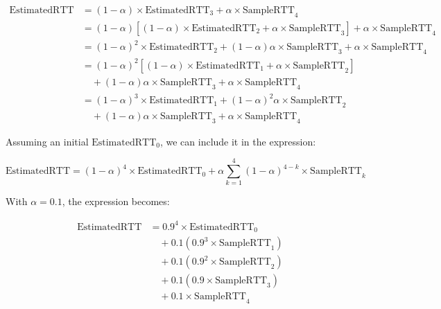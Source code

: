 \documentclass{cshwk}
\begin{document}
\[
    \begin{aligned}
        \text{EstimatedRTT} & = (1 - \alpha) \times \text{EstimatedRTT}_3 + \alpha \times \text{SampleRTT}_4                                                                \\
                            & = (1 - \alpha) \left[ (1 - \alpha) \times \text{EstimatedRTT}_2 + \alpha \times \text{SampleRTT}_3 \right] + \alpha \times \text{SampleRTT}_4 \\
                            & = (1 - \alpha)^2 \times \text{EstimatedRTT}_2 + (1 - \alpha) \alpha \times \text{SampleRTT}_3 + \alpha \times \text{SampleRTT}_4              \\
                            & = (1 - \alpha)^2 \left[ (1 - \alpha) \times \text{EstimatedRTT}_1 + \alpha \times \text{SampleRTT}_2 \right]                                  \\
                            & \quad + (1 - \alpha) \alpha \times \text{SampleRTT}_3 + \alpha \times \text{SampleRTT}_4                                                      \\
                            & = (1 - \alpha)^3 \times \text{EstimatedRTT}_1 + (1 - \alpha)^2 \alpha \times \text{SampleRTT}_2                                               \\
                            & \quad + (1 - \alpha) \alpha \times \text{SampleRTT}_3 + \alpha \times \text{SampleRTT}_4
    \end{aligned}
\]


Assuming an initial \(\text{EstimatedRTT}_0\), we can include it in the expression:

\[
    \text{EstimatedRTT} = (1 - \alpha)^4 \times \text{EstimatedRTT}_0 + \alpha \sum_{k=1}^{4} (1 - \alpha)^{4 - k} \times \text{SampleRTT}_k
\]


With \(\alpha = 0.1\), the expression becomes:

\[
    \begin{aligned}
        \text{EstimatedRTT} & = 0.9^4 \times \text{EstimatedRTT}_0                       \\
                            & \quad + 0.1 \left( 0.9^3 \times \text{SampleRTT}_1 \right) \\
                            & \quad + 0.1 \left( 0.9^2 \times \text{SampleRTT}_2 \right) \\
                            & \quad + 0.1 \left( 0.9 \times \text{SampleRTT}_3 \right)   \\
                            & \quad + 0.1 \times \text{SampleRTT}_4
    \end{aligned}
\]
\end{document}
